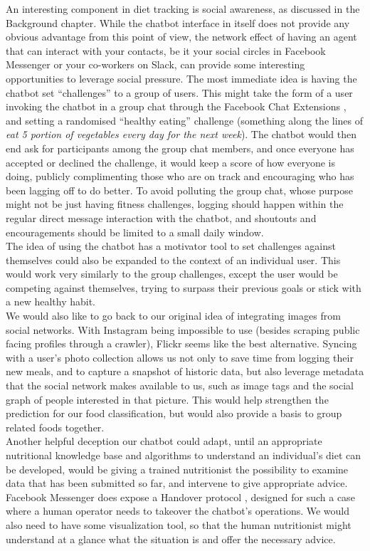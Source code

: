 An interesting component in diet tracking is social awareness, as discussed in the Background chapter. While the chatbot interface in itself does not provide any obvious advantage from this point of view, the network effect of having an agent that can interact with your contacts, be it your social circles in Facebook Messenger or your co-workers on Slack, can provide some interesting opportunities to leverage social pressure. The most immediate idea is having the chatbot set ``challenges'' to a group of users. This might take the form of a user invoking the chatbot in a group chat through the Facebook Chat Extensions \cite{chatextensions}, and setting a randomised ``healthy eating'' challenge (something along the lines of \textit{eat 5 portion of vegetables every day for the next week}). The chatbot would then end ask for participants among the group chat members, and once everyone has accepted or declined the challenge, it would keep a score of how everyone is doing, publicly complimenting those who are on track and encouraging who has been lagging off to do better. To avoid polluting the group chat, whose purpose might not be just having fitness challenges, logging should happen within the regular direct message interaction with the chatbot, and shoutouts and encouragements should be limited to a small daily window. \\
The idea of using the chatbot has a motivator tool to set challenges against themselves could also be expanded to the context of an individual user. This would work very similarly to the group challenges, except the user would be competing against themselves, trying to surpass their previous goals or stick with a new healthy habit. \\
We would also like to go back to our original idea of integrating images from social networks. With Instagram being impossible to use (besides scraping public facing profiles through a crawler), Flickr seems like the best alternative. Syncing with a user's photo collection allows us not only to save time from logging their new meals, and to capture a snapshot of historic data, but also leverage metadata that the social network makes available to us, such as image tags and the social graph of people interested in that picture. This would help strengthen the prediction for our food classification, but would also provide a basis to group related foods together. \\
Another helpful deception our chatbot could adapt, until an appropriate nutritional knowledge base and algorithms to understand an individual's diet can be developed, would be giving a trained nutritionist the possibility to examine data that has been submitted so far, and intervene to give appropriate advice. Facebook Messenger does expose a Handover protocol \cite{handoverfacebook}, designed for such a case where a human operator needs to takeover the chatbot's operations. We would also need to have some visualization tool, so that the human nutritionist might understand at a glance what the situation is and offer the necessary advice.

